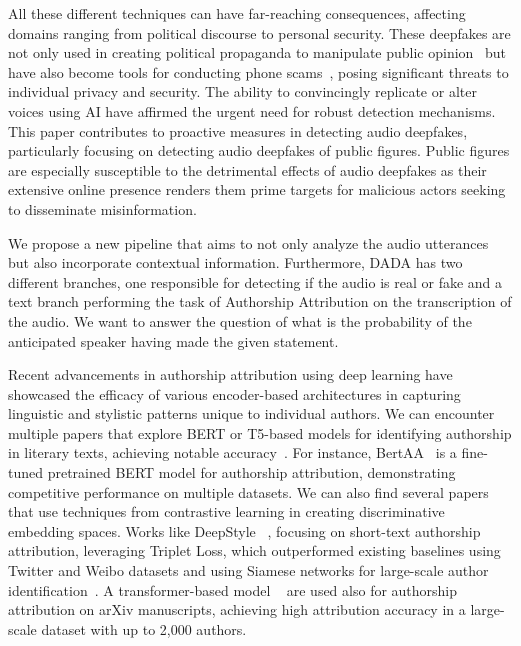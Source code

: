 \documentclass{Interspeech}
\begin{document}
All these different techniques can have far-reaching consequences, affecting
domains ranging from political discourse to personal security. These deepfakes
are not only used in creating political propaganda to manipulate public
opinion~\cite{stuanescuinformational} but have also become tools for conducting
phone scams~\cite{mirsky2022dfcaptcha}, posing significant threats to
individual privacy and security. The ability to convincingly replicate or alter
voices using AI have affirmed the urgent need for robust detection mechanisms.
This paper contributes to proactive measures in detecting audio deepfakes,
particularly focusing on detecting audio deepfakes of public figures. Public
figures are especially susceptible to the detrimental effects of audio
deepfakes as their extensive online presence renders them prime targets for
malicious actors seeking to disseminate misinformation.

We propose a new pipeline that aims to not only analyze the audio utterances
but also incorporate contextual information. Furthermore, DADA has two
different branches, one responsible for detecting if the audio is real or fake
and a text branch performing the task of Authorship Attribution on the
transcription of the audio. We want to answer the question of what is the
probability of the anticipated speaker having made the given statement.

Recent advancements in authorship attribution using deep learning have
showcased the efficacy of various encoder-based architectures in capturing
linguistic and stylistic patterns unique to individual authors. We can
encounter multiple papers that explore BERT or T5-based models for identifying
authorship in literary texts, achieving notable
accuracy~\cite{hicke2023t5,silva2024forged}. For instance,
BertAA~\cite{fabien2020bertaa} is a fine-tuned pretrained BERT model for
authorship attribution, demonstrating competitive performance on multiple
datasets. We can also find several papers that use techniques from contrastive
learning in creating discriminative embedding spaces. Works like DeepStyle
~\cite{hu2020deepstyle}, focusing on short-text authorship attribution,
leveraging Triplet Loss, which outperformed existing baselines using Twitter
and Weibo datasets and using Siamese networks for large-scale author
identification~\cite{saedi2021siamese}. A transformer-based model
~\cite{bauersfeld2023cracking} are used also for authorship attribution on
arXiv manuscripts, achieving high attribution accuracy in a large-scale dataset
with up to 2,000 authors.
\end{document}
